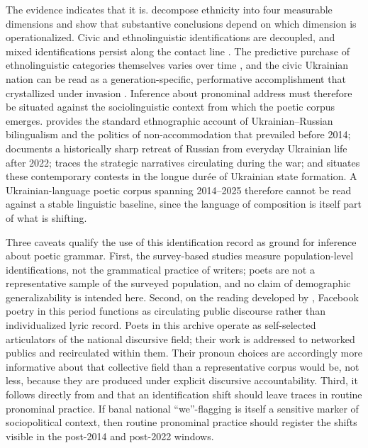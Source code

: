 \documentclass[12pt]{interact}
\theoremstyle{plain}%
\theoremstyle{definition}
\theoremstyle{remark}
\begin{document}
The evidence indicates that it is. \citet{onuch2018capturing} decompose ethnicity into four measurable dimensions and show that substantive conclusions depend on which dimension is operationalized. Civic and
ethnolinguistic identifications are decoupled, and mixed identifications persist along the contact line \citep{popeleches2018identity, sasse2018war}. The predictive purchase of ethnolinguistic categories themselves varies over time \citep{kulyk2022imperfect}, and the civic Ukrainian nation can be read as
a generation-specific, performative accomplishment that crystallized under invasion \citep{onuch2022the}. Inference about pronominal address must therefore be situated against the sociolinguistic context from which the poetic corpus emerges. \citet{bilaniuk2005contested, bilaniuk2010language} provides the standard ethnographic account of Ukrainian--Russian bilingualism
and the politics of non-accommodation that prevailed before 2014; \citet{kulyk2024language} documents a historically sharp retreat of Russian from everyday Ukrainian life after 2022; \citet{popova2024russia} traces the strategic narratives circulating during the war; and \citet{plokhy2021the} situates these contemporary contests in the longue durée of Ukrainian state formation. A Ukrainian-language poetic corpus spanning 2014--2025 therefore cannot be read against a stable linguistic baseline, since the language of composition is itself part of what is shifting.

Three caveats qualify the use of this identification record as ground for inference about poetic grammar. First, the survey-based studies \citep{kulyk2016national, onuch2018capturing, kulyk2022imperfect} measure population-level identifications, not the grammatical practice of writers;
poets are not a representative sample of the surveyed population, and no claim of demographic generalizability is intended here. Second, on the reading developed by \citet{glaser2024poetry}, Facebook poetry in this period functions as circulating public discourse rather than individualized lyric
record. Poets in this archive operate as self-selected articulators of the national discursive field; their work is addressed to networked publics and recirculated within them. Their pronoun choices are accordingly more informative about that collective field than a representative corpus would be, not less, because they are produced under explicit discursive accountability. Third, it follows directly from \citet{billig1995banal} and \citet{petersoo2007what} that an identification shift should leave traces in routine pronominal practice. If banal national ``we''-flagging is itself a sensitive marker of sociopolitical context, then routine pronominal practice should register the shifts visible in the post-2014 and post-2022 windows.
\end{document}
